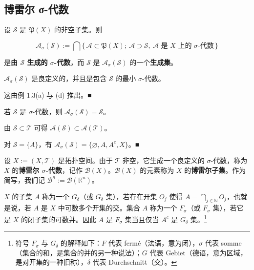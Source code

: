 \subsection*{博雷尔 σ-代数}

设 $ \mathcal{S} $ 是 $ \mathfrak{P}(X) $ 的非空子集。则

\[
\mathcal{A}_{\sigma}(\mathcal{S}) := \bigcap \{\, \mathcal{A} \subset \mathfrak{P}(X) ;\ \mathcal{A} \supset \mathcal{S},\ \mathcal{A} \text{ 是 } X \text{ 上的 } \sigma\text{-代数} \,\}
\]

是\textbf{由 $ \mathcal{S} $ 生成的 $ \sigma $-代数}，而 $ \mathcal{S} $ 是 $ \mathcal{A}_{\sigma}(\mathcal{S}) $ 的一个\textbf{生成集}。

\begin{remark}

\begin{items}
\item

$ \mathcal{A}_{\sigma}(\mathcal{S}) $ 是良定义的，并且是包含 $ \mathcal{S} $ 的最小 $ \sigma $-代数。

\proofhead
这由例 1.3(a) 与 (d) 推出。\nobreak\hspace{0.35em}■
\end{items}

\begin{items}
\item[（b）]

若 $ \mathcal{S} $ 是 $ \sigma $-代数，则 $ \mathcal{A}_{\sigma}(\mathcal{S}) = \mathcal{S} $。

\item[（c）]

由 $ \mathcal{S} \subset \mathcal{T} $ 可得 $ \mathcal{A}(\mathcal{S}) \subset \mathcal{A}(\mathcal{T}) $。

\item[（d）]

对 $ \mathcal{S} = \{A\} $，有 $ \mathcal{A}_{\sigma}(\mathcal{S}) = \{\varnothing, A, A^{c}, X\} $。\nobreak\hspace{0.35em}■

\end{items}

设 $ X := (X, \mathcal{T}) $ 是拓扑空间。由于 $ \mathcal{T} $ 非空，它生成一个良定义的 $ \sigma $-代数，称为 $ X $ 的\textbf{博雷尔 $ \sigma $-代数}，记作 $ \mathcal{B}(X) $。$ \mathcal{B}(X) $ 的元素称为 $ X $ 的\textbf{博雷尔子集}。作为简写，我们记 $ \mathcal{B}^{n} := \mathcal{B}(\mathbb{R}^{n}) $。

$ X $ 的子集 $ A $ 称为一个 $ G_{\delta} $（或 $ G_{\delta} $ 集），若存在开集 $ O_{j} $ 使得 $ A = \bigcap_{j \in \mathbb{N}} O_{j} $，也就是说，若 $ A $ 是 $ X $ 中可数多个开集的交。集合 $ A $ 称为一个 $ F_{\sigma} $（或 $ F_{\sigma} $ 集），若它是 $ X $ 的闭子集的可数并。因此 $ A $ 是 $ F_{\sigma} $ 集当且仅当 $ A^{c} $ 是 $ G_{\delta} $ 集。\footnote{符号 $ F_{\sigma} $ 与 $ G_{\delta} $ 的解释如下：$ F $ 代表 fermé（法语，意为闭），$ \sigma $ 代表 somme（集合的和，是集合的并的另一种说法）；$ G $ 代表 Gebiet（德语，意为区域，是对开集的一种旧称），$ \delta $ 代表 Durchschnitt（交）。}

\end{remark}

